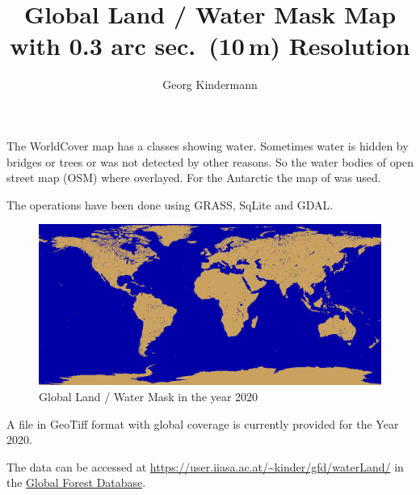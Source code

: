 \documentclass{scrartcl}
\title{Global Land / Water Mask Map with 0.3 arc sec.\ (10\,m) Resolution}
\author{Georg Kindermann}
\begin{document}
\maketitle

The WorldCover map \cite{worldcover2020v100} has a classes showing
water. Sometimes water is hidden by bridges or trees or was not
detected by other reasons. So the water bodies of open street map
(OSM) \cite{osmPlanet} where overlayed. For the Antarctic the map of
\cite{geoboudaries2020} was used.

The operations have been done using GRASS\cite{GRASS_GIS_software},
SqLite\cite{sqlite2020hipp} and GDAL\cite{gdal}.

\begin{figure}[htbp]
  \centering
  \includegraphics[width=.9\linewidth]{map.png}
  \caption{Global Land / Water Mask in the year 2020}
  \label{fig:map}
\end{figure}

A file in GeoTiff format with global coverage is currently provided
for the Year 2020.

The data can be accessed at
\url{https://user.iiasa.ac.at/~kinder/gfd/waterLand/} in the
\href{https://iiasa.ac.at/models-and-data/global-forest-database}{Global
  Forest Database}.



\end{document}

